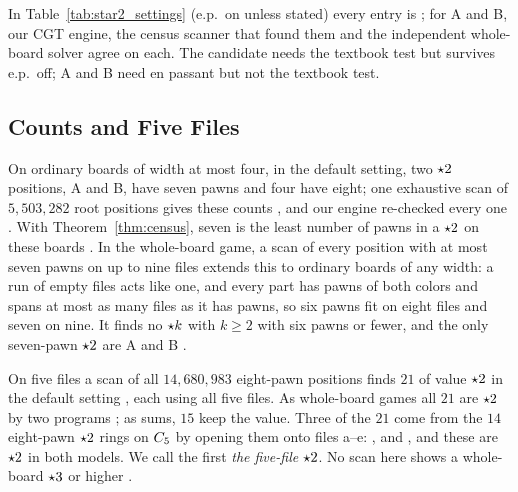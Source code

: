 In Table~\ref{tab:star2_settings} (e.p.\ on unless stated) every entry is ; for A and B, our CGT
engine, the census scanner that found them and the independent whole-board solver agree on each. The candidate
needs the textbook test but survives e.p.\ off; A and B need en passant but not the textbook test.

\subsection{Counts and Five Files}\label{sec:star2-five}

On ordinary boards of width at most four, in the default setting, two $\mathord{\star2}$ positions, A and B, have seven pawns
and four have eight; one exhaustive scan of $5{,}503{,}282$ root positions gives these counts , and our
engine re-checked every one . With
Theorem~\ref{thm:census}, seven is the least number of pawns in a $\mathord{\star2}$ on these boards . In the
whole-board game, a scan of every position with at most seven pawns on up to nine files extends this to ordinary
boards of any width: a run of empty files acts like one, and every part has pawns of both colors and spans at most
as many files as it has pawns, so six pawns fit on eight files and seven on nine. It finds no $\mathord{\star k}$ with $k\ge2$ with six pawns or fewer, and the only seven-pawn $\mathord{\star2}$ are A and
B .

On five files a scan of all $14{,}680{,}983$ eight-pawn positions finds $21$ of value $\mathord{\star2}$ in the default
setting , each using all five files. As whole-board games all $21$ are $\mathord{\star2}$ by two programs ;
as sums, $15$ keep the value. Three of the
$21$ come from the $14$ eight-pawn $\mathord{\star2}$ rings on $C_{5}$  by opening them onto files a--e:
,  and
,
and these are $\mathord{\star2}$ in both models. We call the first \emph{the five-file $\mathord{\star2}$}. No scan here shows a whole-board $\mathord{\star3}$ or higher
.

